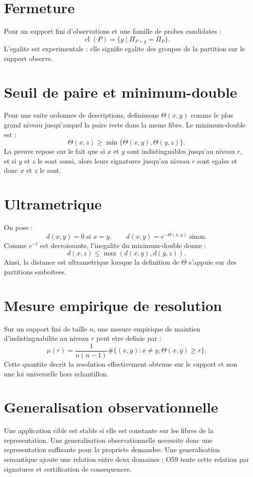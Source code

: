 \documentclass[11pt,a4paper]{article}
\begin{document}
\section{Fermeture}
Pour un support fini d'observations et une famille de probes candidates :
\[
\operatorname{cl}(P)=\{g\mid \Pi_{P+g}=\Pi_P\}.
\]
L'egalite est experimentale : elle signifie egalite des groupes de la partition sur le support observe.

\section{Seuil de paire et minimum-double}
Pour une suite ordonnee de descriptions, definissons $\Theta(x,y)$ comme le plus grand niveau jusqu'auquel la paire reste dans la meme fibre. Le minimum-double est :
\[
\Theta(x,z)\ge\min\{\Theta(x,y),\Theta(y,z)\}.
\]
La preuve repose sur le fait que si $x$ et $y$ sont indistinguables jusqu'au niveau $r$, et si $y$ et $z$ le sont aussi, alors leurs signatures jusqu'au niveau $r$ sont egales et donc $x$ et $z$ le sont.

\section{Ultrametrique}
On pose :
\[
d(x,y)=0\;\text{si }x=y,\qquad d(x,y)=e^{-\Theta(x,y)}\;\text{sinon}.
\]
Comme $e^{-t}$ est decroissante, l'inegalite du minimum-double donne :
\[
d(x,z)\le\max(d(x,y),d(y,z)).
\]
Ainsi, la distance est ultrametrique lorsque la definition de $\Theta$ s'appuie sur des partitions emboitees.

\section{Mesure empirique de resolution}
Sur un support fini de taille $n$, une mesure empirique de maintien d'indistinguabilite au niveau $r$ peut etre definie par :
\[
\mu(r)=\frac{1}{n(n-1)}\#\{(x,y):x\neq y,\Theta(x,y)\ge r\}.
\]
Cette quantite decrit la resolution effectivement obtenue sur le support et non une loi universelle hors echantillon.

\section{Generalisation observationnelle}
Une application cible est stable si elle est constante sur les fibres de la representation. Une generalisation observationnelle necessite donc une representation suffisante pour la propriete demandee. Une generalisation semantique ajoute une relation entre deux domaines ; O59 tente cette relation par signatures et certification de consequences.
\end{document}
